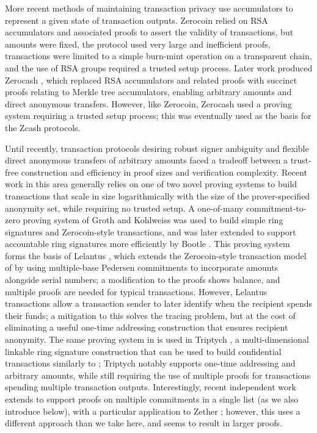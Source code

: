 \documentclass{article}
\theoremstyle{definition}
\begin{document}
More recent methods of maintaining transaction privacy use accumulators to represent a given state of transaction outputs.
Zerocoin \cite{zerocoin} relied on RSA accumulators and associated proofs to assert the validity of transactions, but amounts were fixed, the protocol used very large and inefficient proofs, transactions were limited to a simple burn-mint operation on a transparent chain, and the use of RSA groups required a trusted setup process.
Later work produced Zerocash \cite{zerocash}, which replaced RSA accumulators and related proofs with succinct proofs relating to Merkle tree accumulators, enabling arbitrary amounts and direct anonymous transfers.
However, like Zerocoin, Zerocash used a proving system requiring a trusted setup process; this was eventually used as the basis for the Zcash protocols.

Until recently, transaction protocols desiring robust signer ambiguity and flexible direct anonymous transfers of arbitrary amounts faced a tradeoff between a trust-free construction and efficiency in proof sizes and verification complexity.
Recent work in this area generally relies on one of two novel proving systems to build transactions that scale in size logarithmically with the size of the prover-specified anonymity set, while requiring no trusted setup.
A one-of-many commitment-to-zero proving system of Groth and Kohlweiss \cite{groth} was used to build simple ring signatures and Zerocoin-style transactions, and was later extended to support accountable ring signatures more efficiently by Bootle \cite{bootle}.
This proving system forms the basis of Lelantus \cite{lelantus}, which extends the Zerocoin-style transaction model of \cite{groth} by using multiple-base Pedersen commitments to incorporate amounts alongside serial numbers; a modification to the proofs shows balance, and multiple proofs are needed for typical transactions.
However, Lelantus transactions allow a transaction sender to later identify when the recipient spends their funds; a mitigation to this solves the tracing problem, but at the cost of eliminating a useful one-time addressing construction that ensures recipient anonymity.
The same proving system in \cite{groth} is used in Triptych \cite{triptych}, a multi-dimensional linkable ring signature construction that can be used to build confidential transactions similarly to \cite{ringct}; Triptych notably supports one-time addressing and arbitrary amounts, while still requiring the use of multiple proofs for transactions spending multiple transaction outputs.
Interestingly, recent independent work extends \cite{groth} to support proofs on multiple commitments in a single list (as we also introduce below), with a particular application to Zether \cite{zether}; however, this uses a different approach than we take here, and seems to result in larger proofs.
\end{document}
